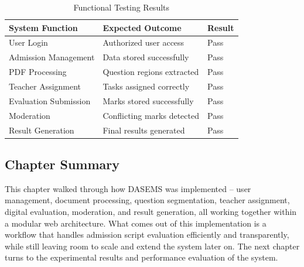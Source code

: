 \begin{table}[H]
\centering
\caption{Functional Testing Results}
\label{tab:functional_testing}

\renewcommand{\arraystretch}{1.2}

\begin{tabular}{|p{6cm}|p{6cm}|p{1.8cm}|}
\hline
\textbf{System Function} & \textbf{Expected Outcome} & \textbf{Result} \\
\hline
User Login & Authorized user access & Pass \\
\hline
Admission Management & Data stored successfully & Pass \\
\hline
PDF Processing & Question regions extracted & Pass \\
\hline
Teacher Assignment & Tasks assigned correctly & Pass \\
\hline
Evaluation Submission & Marks stored successfully & Pass \\
\hline
Moderation & Conflicting marks detected & Pass \\
\hline
Result Generation & Final results generated & Pass \\
\hline
\end{tabular}

\end{table}

\subsection{Chapter Summary}

This chapter walked through how DASEMS was implemented -- user management, document processing, question segmentation, teacher assignment, digital evaluation, moderation, and result generation, all working together within a modular web architecture. What comes out of this implementation is a workflow that handles admission script evaluation efficiently and transparently, while still leaving room to scale and extend the system later on. The next chapter turns to the experimental results and performance evaluation of the system.